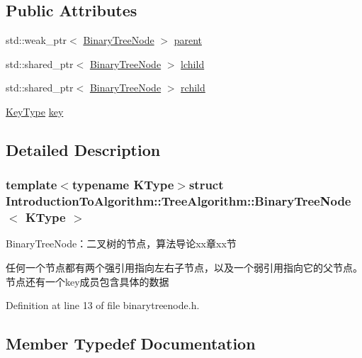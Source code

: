 \subsection*{Public Attributes}
\begin{DoxyCompactItemize}
\item 
std\+::weak\+\_\+ptr$<$ \hyperlink{struct_introduction_to_algorithm_1_1_tree_algorithm_1_1_binary_tree_node}{Binary\+Tree\+Node} $>$ \hyperlink{struct_introduction_to_algorithm_1_1_tree_algorithm_1_1_binary_tree_node_aa94cbc785416ba74505661baac55a9fd}{parent}
\item 
std\+::shared\+\_\+ptr$<$ \hyperlink{struct_introduction_to_algorithm_1_1_tree_algorithm_1_1_binary_tree_node}{Binary\+Tree\+Node} $>$ \hyperlink{struct_introduction_to_algorithm_1_1_tree_algorithm_1_1_binary_tree_node_a3e056b1d34820497ac3a23a16180be2b}{lchild}
\item 
std\+::shared\+\_\+ptr$<$ \hyperlink{struct_introduction_to_algorithm_1_1_tree_algorithm_1_1_binary_tree_node}{Binary\+Tree\+Node} $>$ \hyperlink{struct_introduction_to_algorithm_1_1_tree_algorithm_1_1_binary_tree_node_aaccc444db582ed362bff4e50efbc47c7}{rchild}
\item 
\hyperlink{struct_introduction_to_algorithm_1_1_tree_algorithm_1_1_binary_tree_node_adbd8539e7a907c3a8fe7a8b79e7032e8}{Key\+Type} \hyperlink{struct_introduction_to_algorithm_1_1_tree_algorithm_1_1_binary_tree_node_af3cb8030ab05ccaf1a69a86c9f468b8d}{key}
\end{DoxyCompactItemize}


\subsection{Detailed Description}
\subsubsection*{template$<$typename K\+Type$>$struct Introduction\+To\+Algorithm\+::\+Tree\+Algorithm\+::\+Binary\+Tree\+Node$<$ K\+Type $>$}

Binary\+Tree\+Node：二叉树的节点，算法导论xx章xx节 

任何一个节点都有两个强引用指向左右子节点，以及一个弱引用指向它的父节点。节点还有一个{\ttfamily key}成员包含具体的数据 

Definition at line 13 of file binarytreenode.\+h.



\subsection{Member Typedef Documentation}
\hypertarget{struct_introduction_to_algorithm_1_1_tree_algorithm_1_1_binary_tree_node_adbd8539e7a907c3a8fe7a8b79e7032e8}{}

